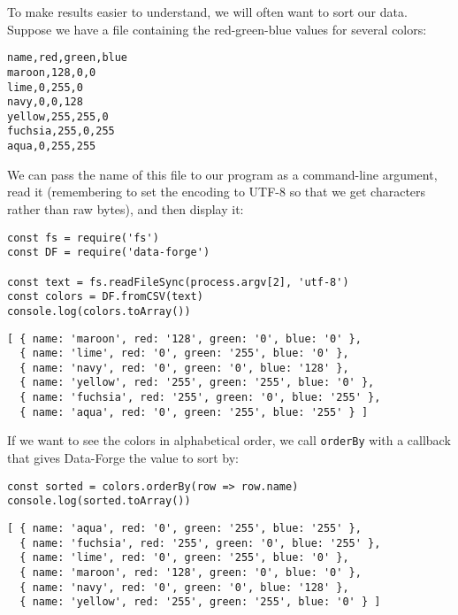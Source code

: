 
To make results easier to understand,
we will often want to sort our data.
Suppose we have a file containing the red-green-blue values for several colors:

\begin{verbatim}
name,red,green,blue
maroon,128,0,0
lime,0,255,0
navy,0,0,128
yellow,255,255,0
fuchsia,255,0,255
aqua,0,255,255
\end{verbatim}

\noindent
We can pass the name of this file to our program as a command-line argument,
read it (remembering to set the encoding to UTF-8 so that we get characters rather than raw bytes),
and then display it:

\begin{verbatim}
const fs = require('fs')
const DF = require('data-forge')

const text = fs.readFileSync(process.argv[2], 'utf-8')
const colors = DF.fromCSV(text)
console.log(colors.toArray())
\end{verbatim}

\begin{verbatim}
[ { name: 'maroon', red: '128', green: '0', blue: '0' },
  { name: 'lime', red: '0', green: '255', blue: '0' },
  { name: 'navy', red: '0', green: '0', blue: '128' },
  { name: 'yellow', red: '255', green: '255', blue: '0' },
  { name: 'fuchsia', red: '255', green: '0', blue: '255' },
  { name: 'aqua', red: '0', green: '255', blue: '255' } ]
\end{verbatim}

If we want to see the colors in alphabetical order,
we call \texttt{orderBy} with a callback that gives Data-Forge the value to sort by:

\begin{verbatim}
const sorted = colors.orderBy(row => row.name)
console.log(sorted.toArray())
\end{verbatim}

\begin{verbatim}
[ { name: 'aqua', red: '0', green: '255', blue: '255' },
  { name: 'fuchsia', red: '255', green: '0', blue: '255' },
  { name: 'lime', red: '0', green: '255', blue: '0' },
  { name: 'maroon', red: '128', green: '0', blue: '0' },
  { name: 'navy', red: '0', green: '0', blue: '128' },
  { name: 'yellow', red: '255', green: '255', blue: '0' } ]
\end{verbatim}

